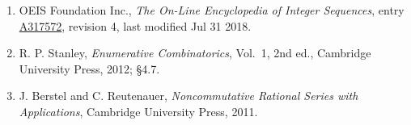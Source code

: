\documentclass[11pt]{article}
\theoremstyle{definition}
\begin{document}
\begin{enumerate}

\item OEIS Foundation Inc., \emph{The On-Line Encyclopedia of Integer Sequences}, entry \href{https://oeis.org/A317572}{A317572}, revision 4, last modified Jul 31 2018.

\item R. P. Stanley, \emph{Enumerative Combinatorics}, Vol.~1, 2nd ed., Cambridge University Press, 2012; \S4.7.

\item J. Berstel and C. Reutenauer, \emph{Noncommutative Rational Series with Applications}, Cambridge University Press, 2011.

\end{enumerate}
\end{document}
